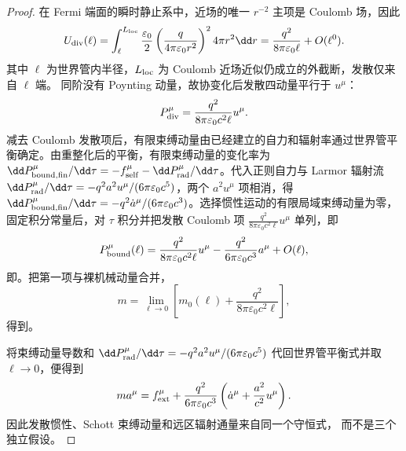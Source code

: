 \begin{proof}
在 Fermi 端面的瞬时静止系中，近场的唯一
\(r^{-2}\) 主项是 Coulomb 场，因此
\[
 U_{\rm div}(\ell)
 =\int_\ell^{L_{\rm loc}}\frac{\varepsilon_0}{2}
 \left(\frac{q}{4\pi\varepsilon_0r^2}\right)^2
 4\pi r^2\dd r
 =\frac{q^2}{8\pi\varepsilon_0\ell}+O(\ell^0).
\]
其中 \(\ell\) 为世界管内半径，\(L_{\rm loc}\) 为 Coulomb 近场近似仍成立的外截断，发散仅来自 \(\ell\) 端。
同阶没有 Poynting 动量，故协变化后发散四动量平行于 \(u^\mu\)：
\[
 P_{\rm div}^\mu
 =\frac{q^2}{8\pi\varepsilon_0c^2\ell}u^\mu .
\]
减去 Coulomb 发散项后，有限束缚动量由已经建立的自力和辐射率通过世界管平衡确定。由重整化后的平衡，有限束缚动量的变化率为 \(\dd P_{\rm bound,fin}^\mu/\dd\tau=-f_{\rm self}^\mu-\dd P_{\rm rad}^\mu/\dd\tau\)。代入正则自力与 Larmor 辐射流 \(\dd P_{\rm rad}^\mu/\dd\tau=-q^2a^2u^\mu/(6\pi\varepsilon_0c^5)\)，两个 \(a^2u^\mu\) 项相消，得 \(\dd P_{\rm bound,fin}^\mu/\dd\tau=-q^2\dot a^\mu/(6\pi\varepsilon_0c^3)\)。选择惯性运动的有限局域束缚动量为零，固定积分常量后，对 \(\tau\) 积分并把发散 Coulomb 项 \(\frac{q^2}{8\pi\varepsilon_0c^2\ell}u^\mu\) 单列，即
\[
 P_{\rm bound}^\mu(\ell)
 =\frac{q^2}{8\pi\varepsilon_0c^2\ell}u^\mu
 -\frac{q^2}{6\pi\varepsilon_0c^3}a^\mu+O(\ell),
\]
即。把第一项与裸机械动量合并，
\[
 m=\lim_{\ell\to0}\left[
 m_0(\ell)+\frac{q^2}{8\pi\varepsilon_0c^2\ell}\right],
\]
得到。

将束缚动量导数和
\(\dd P_{\rm rad}^\mu/\dd\tau
 =-q^2a^2u^\mu/(6\pi\varepsilon_0c^5)\)
代回世界管平衡式并取 \(\ell\to0\)，便得到
\[
 ma^\mu=f_{\rm ext}^\mu+
 \frac{q^2}{6\pi\varepsilon_0c^3}
 \left(\dot a^\mu+\frac{a^2}{c^2}u^\mu\right).
\]
因此发散惯性、Schott 束缚动量和远区辐射通量来自同一个守恒式，
而不是三个独立假设。
\end{proof}
